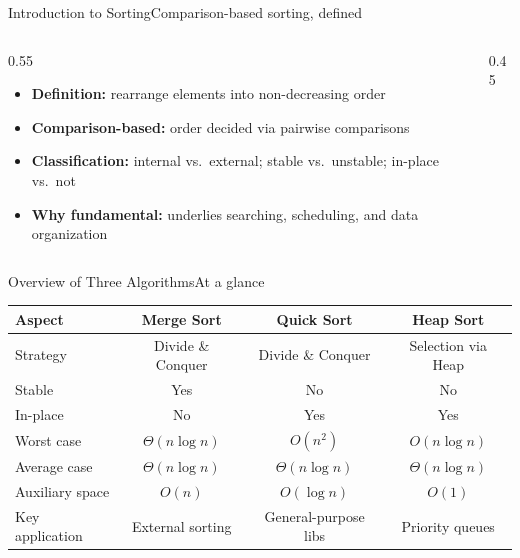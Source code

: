 \documentclass[9pt,aspectratio=169]{beamer}
\begin{document}
\begin{frame}{Introduction to Sorting}{Comparison-based sorting, defined}
\begin{columns}[T]
\begin{column}{0.55\textwidth}
\begin{itemize}
  \item \textbf{Definition:} rearrange elements into non-decreasing order
  \item \textbf{Comparison-based:} order decided via pairwise comparisons
  \item \textbf{Classification:} internal vs.\ external; stable vs.\ unstable; in-place vs.\ not
  \item \textbf{Why fundamental:} underlies searching, scheduling, and data organization
\end{itemize}
\end{column}
\begin{column}{0.45\textwidth}
\end{column}
\end{columns}
\end{frame}

\begin{frame}{Overview of Three Algorithms}{At a glance}
\small
\begin{table}
\begin{tabular}{lccc}
\toprule
\textbf{Aspect} & \textbf{Merge Sort} & \textbf{Quick Sort} & \textbf{Heap Sort}\\
\midrule
Strategy & Divide \& Conquer & Divide \& Conquer & Selection via Heap\\
\rowcolor{lightgrey} Stable & Yes & No & No\\
In-place & No & Yes & Yes\\
\rowcolor{lightgrey} Worst case & \(\Theta(n\log n)\) & \(O(n^2)\) & \(O(n\log n)\)\\
Average case & \(\Theta(n\log n)\) & \(\Theta(n\log n)\) & \(\Theta(n\log n)\)\\
\rowcolor{lightgrey} Auxiliary space & \(O(n)\) & \(O(\log n)\) & \(O(1)\)\\
Key application & External sorting & General-purpose libs & Priority queues\\
\bottomrule
\end{tabular}
\end{table}
\end{frame}
\end{document}
